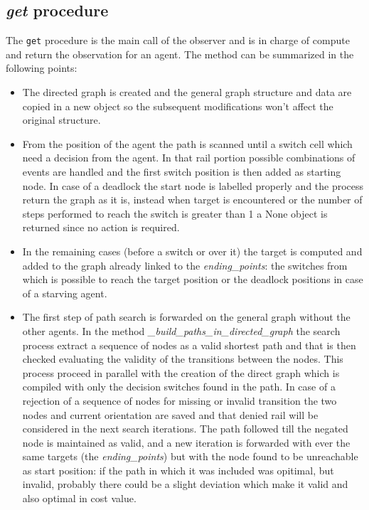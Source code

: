 \subsection{\textit{get} procedure}
The \texttt{get} procedure is the main call of the observer and is in charge of compute and return the observation for an agent.
The method can be summarized in the following points:
\begin{itemize}
    \item The directed graph is created and the general graph structure and data are copied in a new object so the subsequent modifications won't affect the original structure.
    \item From the position of the agent the path is scanned until a switch cell which need a decision from the agent. In that rail portion possible combinations of events are handled and the first switch position is then added as starting node. In case of a deadlock the start node is labelled properly and the process return the graph as it is, instead when target is encountered or the number of steps performed to reach the switch is greater than 1 a None object is returned since no action is required.
    \item In the remaining cases (before a switch or over it) the target is computed and added to the graph already linked to the \textit{ending\_points}: the switches from which is possible to reach the target position or the deadlock positions in case of a starving agent.
    \item The first step of path search is forwarded on the general graph without the other agents. In the method \textit{\_build\_paths\_in\_directed\_graph} the search process extract a sequence of nodes as a valid shortest path and that is then checked evaluating the validity of the transitions between the nodes. This process proceed in parallel with the creation of the direct graph which is compiled with only the decision switches found in the path. In case of a rejection of a sequence of nodes for missing or invalid transition the two nodes and current orientation are saved and that denied rail will be considered in the next search iterations. The path followed till the negated node is maintained as valid, and a new iteration is forwarded with ever the same targets (the \textit{ending\_points}) but with the node found to be unreachable as start position: if the path in which it was included was opitimal, but invalid, probably there could be a slight deviation which make it valid and also optimal in cost value.\\

\end{itemize}
